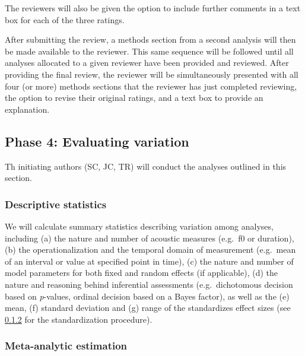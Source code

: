 \documentclass[
  12pt,
]{article}
\begin{document}
The reviewers will also be given the option to include further comments in a text box for each of the three ratings.

After submitting the review, a methods section from a second analysis will then be made available to the reviewer.
This same sequence will be followed until all analyses allocated to a given reviewer have been provided and reviewed.
After providing the final review, the reviewer will be simultaneously presented with all four (or more) methods sections that the reviewer has just completed reviewing, the option to revise their original ratings, and a text box to provide an explanation.

\hypertarget{phase-4-evaluating-variation}{%
\subsection{Phase 4: Evaluating variation}\label{phase-4-evaluating-variation}}

Th initiating authors (SC, JC, TR) will conduct the analyses outlined in this section.

\hypertarget{descriptive-statistics}{%
\subsubsection{Descriptive statistics}\label{descriptive-statistics}}

We will calculate summary statistics describing variation among analyses, including (a) the nature and number of acoustic measures (e.g.~f0 or duration), (b) the operationalization and the temporal domain of measurement (e.g.~mean of an interval or value at specified point in time), (c) the nature and number of model parameters for both fixed and random effects (if applicable), (d) the nature and reasoning behind inferential assessments (e.g.~dichotomous decision based on \emph{p}-values, ordinal decision based on a Bayes factor), as well as the (e) mean, (f) standard deviation and (g) range of the standardizes effect sizes (see \ref{s:meta-est} for the standardization procedure).

\hypertarget{s:meta-est}{%
\subsubsection{Meta-analytic estimation}\label{s:meta-est}}
\end{document}
